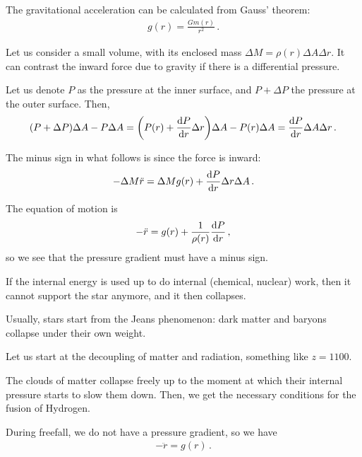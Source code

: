 \documentclass[main.tex]{subfiles}
\begin{document}
The gravitational acceleration can be calculated from Gauss' theorem: 
%
\begin{align}
  g(r) = \frac{G m(r)}{r^2}
\,. 
\end{align}
%

Let us consider a small volume, with its enclosed mass \(\Delta M = \rho (r) \Delta A \Delta r\). It can contrast the inward force due to gravity if there is a differential pressure. 

Let us denote \(P\) as the pressure at the inner surface, and \(P + \Delta P\) the pressure at the outer surface. Then,
%
\begin{align}
\qty(P + \Delta P) \Delta A - P \Delta A 
= \qty(P(r) + \dv{P}{r}\Delta r) \Delta A - P(r) \Delta A 
= \dv{P}{r} \Delta A \Delta r
\,.
\end{align}

The  minus sign in what follows is since the force is inward: 
%
\begin{align}
  - \Delta M \ddot{r} = \Delta M g(r) + \dv{P}{r} \Delta r \Delta A
\,.
\end{align}

The equation of motion is 
%
\begin{align}
  - \ddot{r} = g(r) + \frac{1}{\rho (r)} \dv{P}{r}
\,,
\end{align}
%
so we see that the pressure gradient must have a minus sign. 

If the internal energy is used up to do internal (chemical, nuclear) work, then it cannot support the star anymore, and it then collapses. 

Usually, stars start from the Jeans phenomenon: dark matter and baryons collapse under their own weight. 

Let us start at the decoupling of matter and radiation, something like \(z = 1100\).

The clouds of matter collapse freely up to the moment at which their internal pressure starts to slow them down. Then, we get the necessary conditions for the fusion of Hydrogen. 

During freefall, we do not have a pressure gradient, so we have 
%
\begin{align}
  - \ddot{r} = g(r)
\,.
\end{align}
\end{document}
